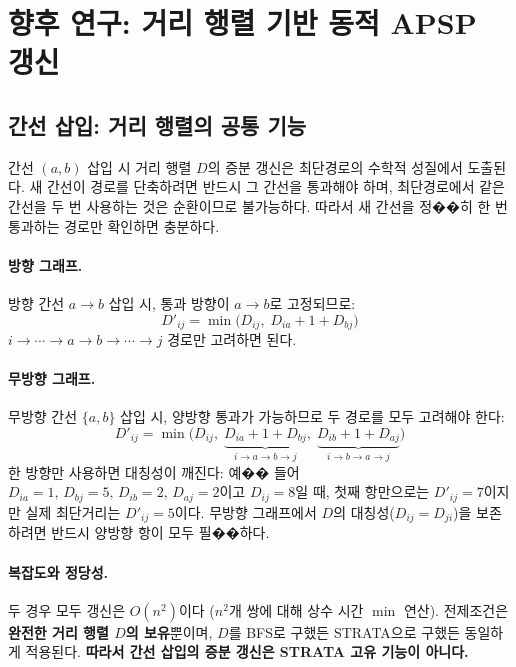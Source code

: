 \documentclass[11pt,a4paper]{article}
\begin{document}
\section{향후 연구: 거리 행렬 기반 동적 APSP 갱신}

\subsection{간선 삽입: 거리 행렬의 공통 기능}

간선 $(a,b)$ 삽입 시 거리 행렬 $D$의 증분 갱신은 최단경로의 수학적 성질에서 도출된다. 새 간선이 경로를 단축하려면 반드시 그 간선을 통과해야 하며, 최단경로에서 같은 간선을 두 번 사용하는 것은 순환이므로 불가능하다. 따라서 새 간선을 정��히 한 번 통과하는 경로만 확인하면 충분하다.

\paragraph{방향 그래프.}
방향 간선 $a \to b$ 삽입 시, 통과 방향이 $a \to b$로 고정되므로:
\[
D'_{ij} = \min\!\big(D_{ij},\; D_{ia} + 1 + D_{bj}\big)
\]
$i \to \cdots \to a \to b \to \cdots \to j$ 경로만 고려하면 된다.

\paragraph{무방향 그래프.}
무방향 간선 $\{a,b\}$ 삽입 시, 양방향 통과가 가능하므로 두 경로를 모두 고려해야 한다:
\[
D'_{ij} = \min\!\big(D_{ij},\; \underbrace{D_{ia} + 1 + D_{bj}}_{i \to a \to b \to j},\; \underbrace{D_{ib} + 1 + D_{aj}}_{i \to b \to a \to j}\big)
\]
한 방향만 사용하면 대칭성이 깨진다: 예�� 들어 $D_{ia}=1,\, D_{bj}=5,\, D_{ib}=2,\, D_{aj}=2$이고 $D_{ij}=8$일 때, 첫째 항만으로는 $D'_{ij}=7$이지만 실제 최단거리는 $D'_{ij}=5$이다. 무방향 그래프에서 $D$의 대칭성($D_{ij}=D_{ji}$)을 보존하려면 반드시 양방향 항이 모두 필��하다.

\paragraph{복잡도와 정당성.}
두 경우 모두 갱신은 $O(n^2)$이다 ($n^2$개 쌍에 대해 상수 시간 $\min$ 연산). 전제조건은 \textbf{완전한 거리 행렬 $D$의 보유}뿐이며, $D$를 BFS로 구했든 STRATA으로 구했든 동일하게 적용된다. \textbf{따라서 간선 삽입의 증분 갱신은 STRATA 고유 기능이 아니다.}
\end{document}
